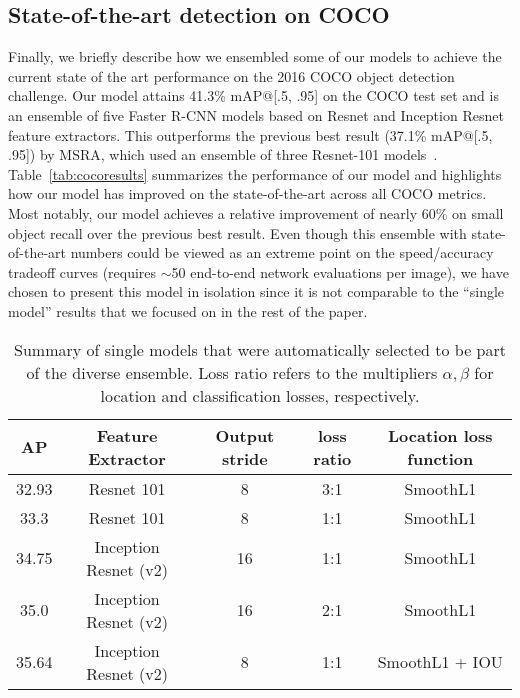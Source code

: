 \documentclass[10pt,twocolumn,letterpaper]{article}
\begin{document}
\subsection{State-of-the-art detection on COCO}

Finally, we briefly describe how we ensembled some of our models to
achieve the current state of the art performance on the 2016 COCO
object detection challenge.  Our model attains 41.3\% mAP@[.5, .95] on
the COCO test set and is an ensemble of five Faster R-CNN models based
on Resnet and Inception Resnet feature extractors.
This outperforms the
previous best result (37.1\% mAP@[.5, .95]) by MSRA, which used an
ensemble of three  
Resnet-101 models~\cite{he2015deep}.
Table~\ref{tab:cocoresults} summarizes the performance of our model
and highlights how our model has improved on the state-of-the-art
across all COCO metrics.  Most notably, our model achieves a relative
improvement of nearly 60\% on small object recall over the previous
best result. 
Even though this ensemble with state-of-the-art numbers could be
viewed as an extreme point on the speed/accuracy tradeoff curves
(requires $\sim$50 end-to-end network evaluations per image), we have
chosen to present this model in isolation since it is not comparable
to the ``single model'' results that we focused on in the rest of the paper.


\begin{table*}[t!]
\begin{center}
{\footnotesize
\begin{tabular}{c|c|c|c|c}
AP & Feature Extractor & Output stride & loss ratio & Location loss function \\
\hline
32.93 & Resnet 101 & 8 & 3:1 & SmoothL1 \\
33.3 & Resnet 101 & 8 & 1:1 & SmoothL1 \\
34.75 & Inception Resnet (v2) & 16 & 1:1 & SmoothL1 \\
35.0 & Inception Resnet (v2) & 16 & 2:1 & SmoothL1 \\
35.64 & Inception Resnet (v2) & 8 & 1:1 & SmoothL1 +  IOU 
\end{tabular}
}
\end{center}
\caption{
\footnotesize 
Summary of single models that were automatically selected to be part
of the diverse ensemble.
Loss ratio refers to the multipliers
$\alpha, \beta$ for location and classification losses, respectively.
}
\label{tab:models_for_ensemble}
\end{table*}
\end{document}
